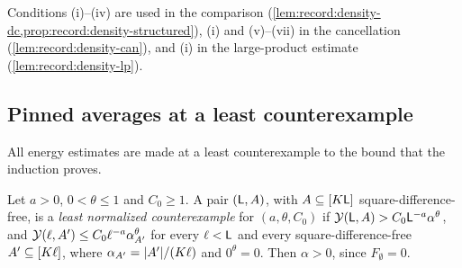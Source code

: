 Conditions (i)--(iv) are used in the comparison
(\cref{lem:record:density-dc,prop:record:density-structured}), (i) and
(v)--(vii) in the cancellation (\cref{lem:record:density-can}), and (i) in the
large-product estimate (\cref{lem:record:density-lp}).

\subsection{Pinned averages at a least counterexample}
\label{subsec:scale:structured}

All energy estimates are made at a least counterexample to the bound that
the induction proves.

\begin{definition}
\label{def:record:counterexample}
Let $a>0$, $0<\theta\le1$ and $C_0\ge1$. A pair $(\mathsf L,A)$, with
$A\subseteq[K\mathsf L]$ square-difference-free, is a \emph{least normalized
counterexample} for $(a,\theta,C_0)$ if $\mathcal Y(\mathsf L,A)>C_0\mathsf L^{-a}\alpha^\theta$,
and $\mathcal Y(\ell,A')\le C_0\ell^{-a}\alpha_{A'}^\theta$ for every $\ell<\mathsf L$ and
every square-difference-free $A'\subseteq[K\ell]$, where
$\alpha_{A'}=|A'|/(K\ell)$ and $0^\theta=0$. Then $\alpha>0$, since
$F_\emptyset=0$.
\end{definition}

